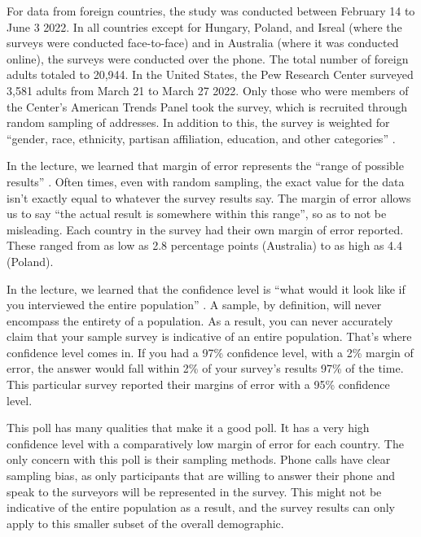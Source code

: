 \documentclass[a4paper]{article}
\begin{document}
        For data from foreign countries, the study was conducted between February 14 to June 3 2022. In all countries except for Hungary, Poland, and Isreal (where the surveys were conducted face-to-face) and in Australia (where it was conducted online), the surveys were conducted over the phone.
        The total number of foreign adults totaled to 20,944. In the United States, the Pew Research Center surveyed 3,581 adults from March 21 to March 27 2022. Only those who were members of the Center’s American Trends Panel took the survey, which is recruited through random sampling of addresses.
        In addition to this, the survey is weighted for “gender, race, ethnicity, partisan affiliation, education, and other categories” \citep{poll}. 

        In the lecture, we learned that margin of error represents the “range of possible results” \citep{lesson7}. Often times, even with random sampling, the exact value for the data isn’t exactly equal to whatever the survey results say. The margin of error allows us to 
        say “the actual result is somewhere within this range”, so as to not be misleading. Each country in the survey had their own margin of error reported. These ranged from as low as 2.8 percentage points (Australia) to as high as 4.4 (Poland). 

        In the lecture, we learned that the confidence level is “what would it look like if you interviewed the entire population” \citep{lesson7}. A sample, by definition, will never encompass the entirety of a population. As a result, you can never accurately claim that your 
        sample survey is indicative of an entire population. That’s where confidence level comes in. If you had a 97\% confidence level, with a 2\% margin of error, the answer would fall within 2\% of your survey’s results 97\% of the time. This particular survey reported their margins of 
        error with a 95\% confidence level. 

        This poll has many qualities that make it a good poll. It has a very high confidence level with a comparatively low margin of error for each country. The only concern with this poll is their sampling methods. Phone calls have clear sampling bias, as only participants that are willing
         to answer their phone and speak to the surveyors will be represented in the survey. This might not be indicative of the entire population as a result, and the survey results can only apply to this smaller subset of the overall demographic. 
\end{document}
